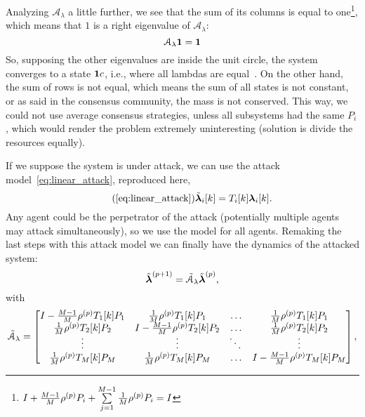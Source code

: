 \documentclass[../main.tex]{subfiles}
\begin{document}
Analyzing $\mathcal{A}_{\lambda}$ a little further, we see that the sum of its columns is equal to one\footnote{$I+\frac{M-1}{M}\rho^{(p)} P_{i}+\sum\limits_{j=1}^{M-1}\frac{1}{M}\rho^{(p)} P_{i}=I$},
which means that $1$ is a right eigenvalue of $\mathcal{A}_{\lambda}$:
\begin{equation*}
  \mathcal{A}_{\lambda}\mathbf{1}=\mathbf{1}
\end{equation*}
So, supposing the other eigenvalues are inside the unit circle, the system converges to a state $\mathbf{1}c$, i.e., where all lambdas are equal~\cite{GarinSchenato2010,XiaoEtAl2007}.
On the other hand, the sum of rows is not equal, which means the sum of all states is not constant, or as said in the consensus community, the mass is not conserved.
This way, we could not use average consensus strategies, unless all subsystems had the same $P_{i}$, which would render the problem extremely uninteresting (solution is divide the resources equally).

If we suppose the system is under attack, we can use the attack model~\eqref{eq:linear_attack}, reproduced here,
\begin{equation}
  \label{eq:linear_attack_reprise}
  \tag{\ref*{eq:linear_attack}}
  \tilde{\vec{\lambda}}_{i}[k]=T_{i}[k]\lambdaik.
\end{equation}
Any agent could be the perpetrator of the attack (potentially multiple agents may attack simultaneously), so we use the model for all agents.
Remaking the last steps with this attack model we can finally have the dynamics of the attacked system:
\begin{equation}
  \label{eq:negotiation_equation_substituting_organizing_under_attack}
  \tilde{\boldsymbol{\lambda}}^{(p+1)}=\tilde{\mathcal{A}}_{\lambda}\tilde{\boldsymbol{\lambda}}^{(p)},
\end{equation}
with
\begin{equation}
\tilde{\mathcal{A}}_{\lambda}=\left[
\begin{matrix}
I-\frac{M-1}{M}\rho\p T_{1}[k]P_{1} & \frac{1}{M}\rho\p T_{1}[k]P_{1}&\dots&\frac{1}{M}\rho\p T_{1}[k]P_{1}\\
\frac{1}{M}\rho\p T_{2}[k]P_{2}&I-\frac{M-1}{M}\rho\p T_{2}[k]P_{2}&\dots&\frac{1}{M}\rho\p T_{2}[k]P_{2}\\
\vdots&\vdots&\ddots&\vdots\\
\frac{1}{M}\rho\p T_{M}[k]P_{M}&\frac{1}{M}\rho\p T_{M}[k]P_{M}&\dots&I-\frac{M-1}{M}\rho\p T_{M}[k]P_{M}\\
\end{matrix}
\right],
\end{equation}
\end{document}
